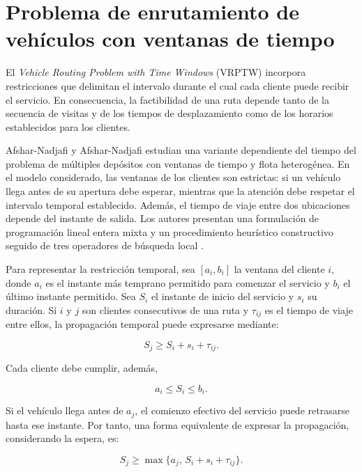 \section{Problema de enrutamiento de vehículos con ventanas de tiempo}
\label{sec:vrptw}

El \textit{Vehicle Routing Problem with Time Windows} (VRPTW) incorpora restricciones que delimitan el intervalo durante el cual cada cliente puede recibir el servicio. En consecuencia, la factibilidad de una ruta depende tanto de la secuencia de visitas y de los tiempos de desplazamiento como de los horarios establecidos para los clientes.

Afshar-Nadjafi y Afshar-Nadjafi estudian una variante dependiente del tiempo del problema de múltiples depósitos con ventanas de tiempo y flota heterogénea. En el modelo considerado, las ventanas de los clientes son estrictas: si un vehículo llega antes de su apertura debe esperar, mientras que la atención debe respetar el intervalo temporal establecido. Además, el tiempo de viaje entre dos ubicaciones depende del instante de salida. Los autores presentan una formulación de programación lineal entera mixta y un procedimiento heurístico constructivo seguido de tres operadores de búsqueda local \cite{afshar2017}.

Para representar la restricción temporal, sea $[a_i,b_i]$ la ventana del cliente $i$, donde $a_i$ es el instante más temprano permitido para comenzar el servicio y $b_i$ el último instante permitido. Sea $S_i$ el instante de inicio del servicio y $s_i$ su duración. Si $i$ y $j$ son clientes consecutivos de una ruta y $\tau_{ij}$ es el tiempo de viaje entre ellos, la propagación temporal puede expresarse mediante:

\begin{equation}
S_j \geq S_i+s_i+\tau_{ij}.
\label{eq:propagacion_tiempo}
\end{equation}

Cada cliente debe cumplir, además,

\begin{equation}
a_i \leq S_i \leq b_i.
\label{eq:ventana_estricta}
\end{equation}

Si el vehículo llega antes de $a_j$, el comienzo efectivo del servicio puede retrasarse hasta ese instante. Por tanto, una forma equivalente de expresar la propagación, considerando la espera, es:

\begin{equation}
S_j \geq \max\{a_j,\,S_i+s_i+\tau_{ij}\}.
\label{eq:espera_tiempo}
\end{equation}

